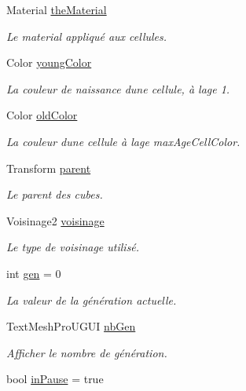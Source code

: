 \begin{DoxyCompactItemize}
Material \mbox{\hyperlink{class_simulation_af963c65cf7e59af39846bdfd1fb1974a}{the\+Material}}
\begin{DoxyCompactList}\small\item\em Le material appliqué aux cellules. \end{DoxyCompactList}\item 
Color \mbox{\hyperlink{class_simulation_aab81b3b62207548fc9129270529e2641}{young\+Color}}
\begin{DoxyCompactList}\small\item\em La couleur de naissance d\textquotesingle{}une cellule, à l\textquotesingle{}age 1. \end{DoxyCompactList}\item 
Color \mbox{\hyperlink{class_simulation_acb69f99e6f099b7da09bd91e33f71d89}{old\+Color}}
\begin{DoxyCompactList}\small\item\em La couleur d\textquotesingle{}une cellule à l\textquotesingle{}age max\+Age\+Cell\+Color. \end{DoxyCompactList}\item 
Transform \mbox{\hyperlink{class_simulation_a3b7a08db81fe21502f57813cc436090d}{parent}}
\begin{DoxyCompactList}\small\item\em Le parent des cubes. \end{DoxyCompactList}\item 
Voisinage2 \mbox{\hyperlink{class_simulation_abace05fc32d6e12236e7e272a901df49}{voisinage}}
\begin{DoxyCompactList}\small\item\em Le type de voisinage utilisé. \end{DoxyCompactList}\item 
int \mbox{\hyperlink{class_simulation_a5d6130f94a3799a582363321183df42d}{gen}} = 0
\begin{DoxyCompactList}\small\item\em La valeur de la génération actuelle. \end{DoxyCompactList}\item 
Text\+Mesh\+Pro\+U\+G\+UI \mbox{\hyperlink{class_simulation_ab24b02a8f790b6463ba78b986c014ab0}{nb\+Gen}}
\begin{DoxyCompactList}\small\item\em Afficher le nombre de génération. \end{DoxyCompactList}\item 
bool \mbox{\hyperlink{class_simulation_a8bc1fd239c1b82110d8789d5cb2b8daa}{in\+Pause}} = true

\end{DoxyCompactItemize}
